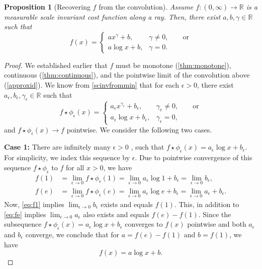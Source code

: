 \documentclass{article}
\newtheorem{proposition}{Proposition}
\newcommand{\e}{\epsilon}
\newcommand{\fpe}{f\star\phi_\e}
\newcommand{\aep}{a_\e}
\newcommand{\be}{b_\e}
\begin{document}
\begin{proposition}[Recovering $f$ from the convolution]\label{recoverf}
  Assume $f:(0,\infty)\rightarrow\mathbb{R}$ is a measurable scale
  invariant cost function along a ray. Then, there exist
  $a,b,\gamma\in\mathbb{R}$ such that
  \[
f(x) =
\begin{cases}
  ax^\gamma +b,& \gamma\neq 0, \qquad \mbox{or} \\
  a\log x +b,& \gamma =0.
\end{cases}
\]
\end{proposition}

\begin{proof}
  We established earlier that $f$ must be monotone
  (\cref{thm:monotone}), continuous (\cref{thm:continuous}), and
  the pointwise limit of the convolution above
  (\cref{approxid}).
  We know from \cref{scinvfrommin} that for each $\epsilon>0$, there exist
  $a_\e,b_\e,\gamma_\e\in\mathbb{R}$ such that
  \[
\fpe(x) =
\begin{cases}
  a_\e
  x^{\gamma_\e} +b_\e,& \gamma_e\neq 0, \qquad \mbox{or} \\
  a_\e\log x +b_\e, & \gamma_\e =0,
\end{cases}
\]
and $f\star\phi_\epsilon(x)\rightarrow f$ pointwise. We consider the
following two cases.


{\bf Case 1:} There are infinitely many $\e>0$ , such that
$\fpe(x) =a_\e \log x + b_\e$.
For simplicity, we index this sequence by $\e$. Due to pointwise
convergence of this sequence $\fpe$ to $f$ for all $x>0$, we have
\begin{align}
  f(1)& = \lim_{\e\rightarrow 0} \fpe(1) =  \lim_{\e\rightarrow 0} a_\e
  \log 1 +b_\e =  \lim_{\e\rightarrow 0} b_\epsilon, \label{eq:f1} \\
  f(e)& = \lim_{\e\rightarrow 0} \fpe(e) =  \lim_{\e\rightarrow 0} a_\e
  \log e +b_\e =  \lim_{\e\rightarrow 0}a_\e + b_\epsilon. \label{eq:fe}
\end{align}
 Now, \cref{eq:f1} implies $ \lim_{\e\rightarrow 0} b_\epsilon $ exists and equals
 $f(1)$. This, in addition to \cref{eq:fe} implies
 $\lim_{\e\rightarrow 0} a_\e $ also exists and equals $f(e)-f(1)$.
 Since the subsequence $\fpe(x) = \aep \log x +\be$ converges to
 $f(x)$ pointwise and both $\aep$ and $\be$ converge, we conclude that
 for $a = f(e)-f(1)$ and $b = f(1)$, we have
 \[f(x) = a\log x +b. \]


\end{proof}
\end{document}
